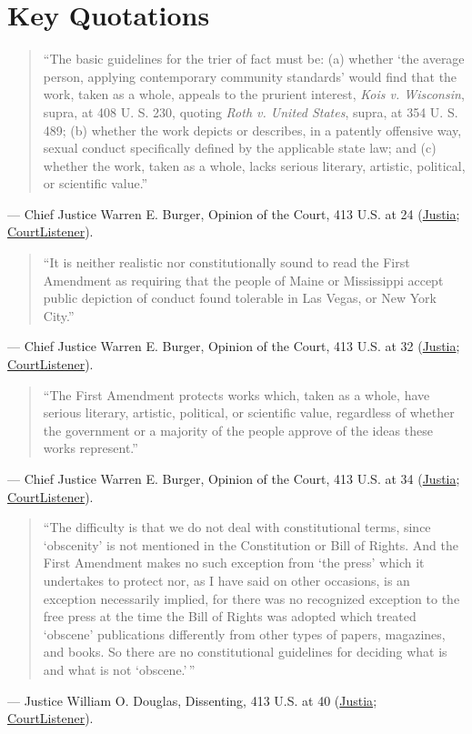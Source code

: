 \documentclass[12pt]{article}
\begin{document}
\section{Key Quotations}
\begin{quote}
``The basic guidelines for the trier of fact must be: (a) whether `the average person, applying contemporary community standards' would find that the work, taken as a whole, appeals to the prurient interest, \textit{Kois v. Wisconsin}, supra, at 408 U. S. 230, quoting \textit{Roth v. United States}, supra, at 354 U. S. 489; (b) whether the work depicts or describes, in a patently offensive way, sexual conduct specifically defined by the applicable state law; and (c) whether the work, taken as a whole, lacks serious literary, artistic, political, or scientific value.''
\end{quote}
\noindent --- Chief Justice Warren E. Burger, Opinion of the Court, 413 U.S. at 24 (\href{https://supreme.justia.com/cases/federal/us/413/15/}{Justia}; \href{https://www.courtlistener.com/opinion/108838/miller-v-california/}{CourtListener}).

\begin{quote}
``It is neither realistic nor constitutionally sound to read the First Amendment as requiring that the people of Maine or Mississippi accept public depiction of conduct found tolerable in Las Vegas, or New York City.''
\end{quote}
\noindent --- Chief Justice Warren E. Burger, Opinion of the Court, 413 U.S. at 32 (\href{https://supreme.justia.com/cases/federal/us/413/15/}{Justia}; \href{https://www.courtlistener.com/opinion/108838/miller-v-california/}{CourtListener}).

\begin{quote}
``The First Amendment protects works which, taken as a whole, have serious literary, artistic, political, or scientific value, regardless of whether the government or a majority of the people approve of the ideas these works represent.''
\end{quote}
\noindent --- Chief Justice Warren E. Burger, Opinion of the Court, 413 U.S. at 34 (\href{https://supreme.justia.com/cases/federal/us/413/15/}{Justia}; \href{https://www.courtlistener.com/opinion/108838/miller-v-california/}{CourtListener}).

\begin{quote}
``The difficulty is that we do not deal with constitutional terms, since `obscenity' is not mentioned in the Constitution or Bill of Rights. And the First Amendment makes no such exception from `the press' which it undertakes to protect nor, as I have said on other occasions, is an exception necessarily implied, for there was no recognized exception to the free press at the time the Bill of Rights was adopted which treated `obscene' publications differently from other types of papers, magazines, and books. So there are no constitutional guidelines for deciding what is and what is not `obscene.'\,''
\end{quote}
\noindent --- Justice William O. Douglas, Dissenting, 413 U.S. at 40 (\href{https://supreme.justia.com/cases/federal/us/413/15/}{Justia}; \href{https://www.courtlistener.com/opinion/108838/miller-v-california/}{CourtListener}).
\end{document}
